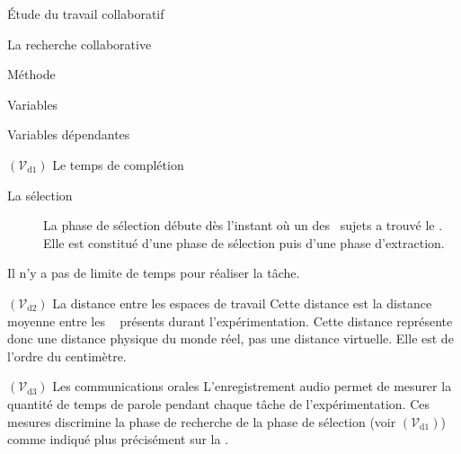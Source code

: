 \documentclass[myfrancais]{mythesis}
\newcommand{\mynum}[1]{\nombre{#1}}
\newcommand{\myvar}[2]{$\left(\mathcal{V}_{\mathrm{#1}#2}\right)$\xspace}
\newcommand{\myvard}[1]{\myvar{d}{#1}}
\begin{document}
\begin{mypart}{Étude du travail collaboratif}
\begin{mychapter}{La recherche collaborative}
\begin{mysection}{Méthode}
\begin{mysubsection}{Variables}
\begin{mysubsubsection}{Variables dépendantes}
\begin{myparagraph}{\myvard{1} Le temps de complétion}
\begin{description}
								\item[La sélection] La phase de sélection débute dès l'instant où un des \mynum{2}~sujets a trouvé le .
									Elle est constitué d'une phase de sélection puis d'une phase d'extraction.
							\end{description}
							Il n'y a pas de limite de temps pour réaliser la tâche.
						\end{myparagraph}
						\begin{myparagraph}{\myvard{2} La distance entre les espaces de travail}
							Cette distance est la distance moyenne entre les \mynum{2}~ présents durant l'expérimentation.
							Cette distance représente donc une distance physique du monde réel, pas une distance virtuelle.
							Elle est de l'ordre du centimètre.
						\end{myparagraph}
						\begin{myparagraph}{\myvard{3} Les communications orales}
							L'enregistrement audio permet de mesurer la quantité de temps de parole pendant chaque tâche de l'expérimentation.
							Ces mesures discrimine la phase de recherche de la phase de sélection (voir \myvard{1}) comme indiqué plus précisément sur la .


\end{myparagraph}
\end{mysubsubsection}
\end{mysubsection}
\end{mysection}
\end{mychapter}
\end{mypart}
\end{document}
